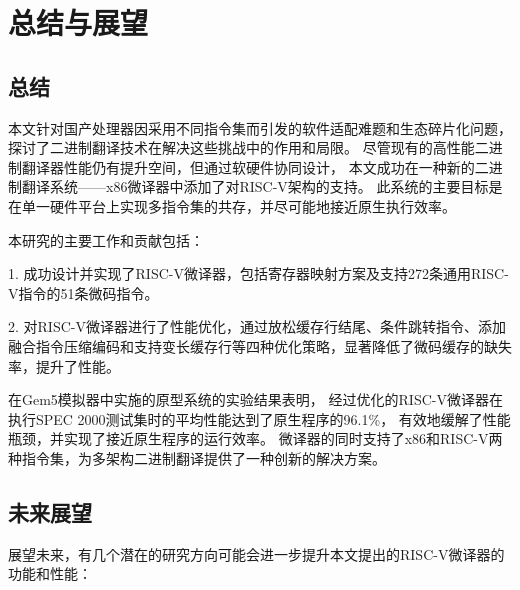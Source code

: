 \chapter{总结与展望}\label{chap:Conclusion}


\section{总结}
本文针对国产处理器因采用不同指令集而引发的软件适配难题和生态碎片化问题，探讨了二进制翻译技术在解决这些挑战中的作用和局限。
尽管现有的高性能二进制翻译器性能仍有提升空间，但通过软硬件协同设计，
本文成功在一种新的二进制翻译系统——x86微译器中添加了对RISC-V架构的支持。
此系统的主要目标是在单一硬件平台上实现多指令集的共存，并尽可能地接近原生执行效率。

本研究的主要工作和贡献包括：

1. 成功设计并实现了RISC-V微译器，包括寄存器映射方案及支持272条通用RISC-V指令的51条微码指令。

2. 对RISC-V微译器进行了性能优化，通过放松缓存行结尾、条件跳转指令、添加融合指令压缩编码和支持变长缓存行等四种优化策略，显著降低了微码缓存的缺失率，提升了性能。

在Gem5模拟器中实施的原型系统的实验结果表明，
经过优化的RISC-V微译器在执行SPEC 2000测试集时的平均性能达到了原生程序的96.1\%，
有效地缓解了性能瓶颈，并实现了接近原生程序的运行效率。
微译器的同时支持了x86和RISC-V两种指令集，为多架构二进制翻译提供了一种创新的解决方案。

\section{未来展望}

展望未来，有几个潜在的研究方向可能会进一步提升本文提出的RISC-V微译器的功能和性能：


